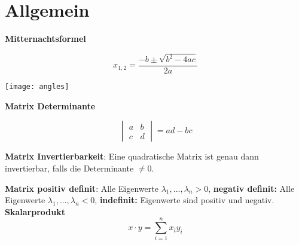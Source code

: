 \section{Allgemein}

\textbf{Mitternachtsformel}

\[
    x_{1, 2} = \frac{-b \pm \sqrt{b^2 - 4ac}}{2a}
\]

\texttt{[image: angles]}

\textbf{Matrix Determinante}

\[
    \begin{vmatrix}
        a & b\\
        c & d
    \end{vmatrix} = ad-bc
\]

\textbf{Matrix Invertierbarkeit}: Eine quadratische Matrix ist genau dann invertierbar, falls die Determinante $\neq 0$.

\textbf{Matrix positiv definit}: Alle Eigenwerte $\lambda_1, ..., \lambda_n > 0$, \textbf{negativ definit:} Alle Eigenwerte $\lambda_1, ..., \lambda_n < 0$, \textbf{indefinit:} Eigenwerte sind positiv und negativ.\\

\textbf{Skalarprodukt} \[ x \cdot y = \sum_{i=1}^n x_i y_i \]